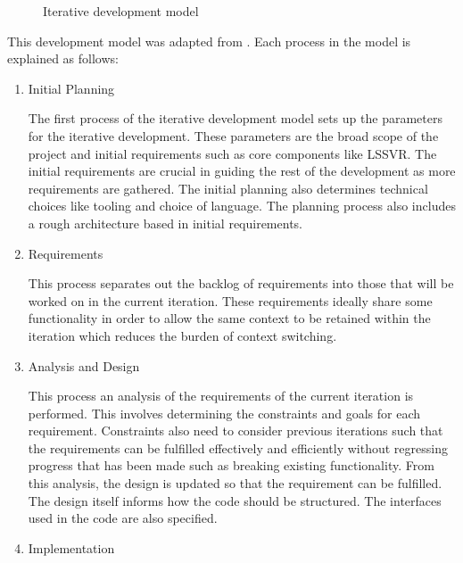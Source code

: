 \begin{figure}[H]
      \centering
      \begin{adjustbox}{max width=\textwidth}
      \end{adjustbox}
      \caption{Iterative development model}\label{fig:iterative_development_diagram}
\end{figure}

This development model was adapted from \textcite{bittnerManagingIterativeSoftware2006}. Each process in the model is explained as follows:
\begin{enumerate}
      \item Initial Planning

            The first process of the iterative development model sets up the parameters for the iterative development. These parameters are the broad scope of the project and initial requirements such as core components like LSSVR\@. The initial requirements are crucial in guiding the rest of the development as more requirements are gathered. The initial planning also determines technical choices like tooling and choice of language. The planning process also includes a rough architecture based in initial requirements.

      \item Requirements

            This process separates out the backlog of requirements into those that will be worked on in the current iteration. These requirements ideally share some functionality in order to allow the same context to be retained within the iteration which reduces the burden of context switching.

      \item Analysis and Design

            This process an analysis of the requirements of the current iteration is performed. This involves determining the constraints and goals for each requirement. Constraints also need to consider previous iterations such that the requirements can be fulfilled effectively and efficiently without regressing progress that has been made such as breaking existing functionality. From this analysis, the design is updated so that the requirement can be fulfilled. The design itself informs how the code should be structured. The interfaces used in the code are also specified.

      \item Implementation


\end{enumerate}
